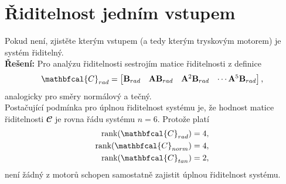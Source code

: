 \documentclass[twoside]{article}
\begin{document}
\section{Řiditelnost jedním vstupem}
\label{sec:ukol2}
Pokud není, zjistěte kterým vstupem (a tedy kterým tryskovým motorem) je systém řiditelný. \\
\textbf{Řešení:}
Pro analýzu řiditelnosti sestrojím matice řiditelnosti z definice
\begin{equation}
	\mathbfcal{C}_\rad = \begin{bmatrix}
		\mathbf{B}_\rad & \mathbf{A}\mathbf{B}_\rad & \mathbf{A}^2 \mathbf{B}_\rad & \cdots \mathbf{A}^5 \mathbf{B}_\rad
	\end{bmatrix},
	\label{eq:riditelnost}
\end{equation}
analogicky pro směry normálový a tečný.\\
Postačující podmínka pro úplnou řiditelnost systému je, že hodnost matice řiditelnosti $\mathbfcal{C}$ je rovna řádu systému $n=6$. Protože platí
\begin{equation*}
	\begin{split}
		\text{rank}(\mathbfcal{C}_\rad) &= 4, \\
		\text{rank}(\mathbfcal{C}_\norm) &= 4, \\
		\text{rank}(\mathbfcal{C}_\tan) &= 2, \\
	\end{split}
\end{equation*}
není žádný z motorů schopen samostatně zajistit úplnou řiditelnost systému.
\end{document}
